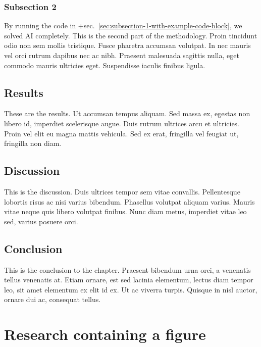 \documentclass[12pt,a4paper,]{report}
\begin{document}
\hypertarget{subsection-2}{%
\subsection{Subsection 2}\label{subsection-2}}

By running the code in
+sec.~\ref{sec:subsection-1-with-example-code-block}, we solved AI
completely. This is the second part of the methodology. Proin tincidunt
odio non sem mollis tristique. Fusce pharetra accumsan volutpat. In nec
mauris vel orci rutrum dapibus nec ac nibh. Praesent malesuada sagittis
nulla, eget commodo mauris ultricies eget. Suspendisse iaculis finibus
ligula.

\hypertarget{results}{%
\section{Results}\label{results}}

These are the results. Ut accumsan tempus aliquam. Sed massa ex, egestas
non libero id, imperdiet scelerisque augue. Duis rutrum ultrices arcu et
ultricies. Proin vel elit eu magna mattis vehicula. Sed ex erat,
fringilla vel feugiat ut, fringilla non diam.

\hypertarget{discussion}{%
\section{Discussion}\label{discussion}}

This is the discussion. Duis ultrices tempor sem vitae convallis.
Pellentesque lobortis risus ac nisi varius bibendum. Phasellus volutpat
aliquam varius. Mauris vitae neque quis libero volutpat finibus. Nunc
diam metus, imperdiet vitae leo sed, varius posuere orci.

\hypertarget{conclusion-1}{%
\section{Conclusion}\label{conclusion-1}}

This is the conclusion to the chapter. Praesent bibendum urna orci, a
venenatis tellus venenatis at. Etiam ornare, est sed lacinia elementum,
lectus diam tempor leo, sit amet elementum ex elit id ex. Ut ac viverra
turpis. Quisque in nisl auctor, ornare dui ac, consequat tellus.

\hypertarget{research-containing-a-figure}{%
\chapter{Research containing a
figure}\label{research-containing-a-figure}}
\end{document}
